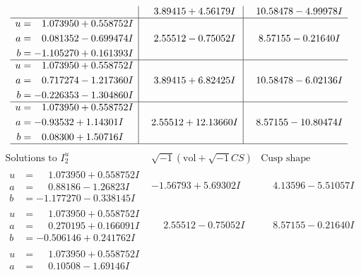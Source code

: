 \documentclass[1p]{elsarticle_modified}
\theoremstyle{definition}
\newcommand{\I}{\sqrt{-1}}
\begin{document}
$$\begin{array}{c|c|c}
 & \phantom{-}3.89415 + 4.56179 I & \phantom{-}10.58478 - 4.99978 I \\ \hline\begin{aligned}
u &= \phantom{-}1.073950 + 0.558752 I \\
a &= \phantom{-}0.081352 - 0.699474 I \\
b &= -1.105270 + 0.161393 I\end{aligned}
 & \phantom{-}2.55512 - 0.75052 I & \phantom{-}8.57155 - 0.21640 I \\ \hline\begin{aligned}
u &= \phantom{-}1.073950 + 0.558752 I \\
a &= \phantom{-}0.717274 - 1.217360 I \\
b &= -0.226353 - 1.304860 I\end{aligned}
 & \phantom{-}3.89415 + 6.82425 I & \phantom{-}10.58478 - 6.02136 I \\ \hline\begin{aligned}
u &= \phantom{-}1.073950 + 0.558752 I \\
a &= -0.93532 + 1.14301 I \\
b &= \phantom{-}0.08300 + 1.50716 I\end{aligned}
 & \phantom{-}2.55512 + 12.13660 I & \phantom{-}8.57155 - 10.80474 I\\
 \hline 
 \end{array}$$\newpage$$\begin{array}{c|c|c}  
\text{Solutions to }I^u_{2}& \I (\text{vol} + \sqrt{-1}CS) & \text{Cusp shape}\\
 \hline 
\begin{aligned}
u &= \phantom{-}1.073950 + 0.558752 I \\
a &= \phantom{-}0.88186 - 1.26823 I \\
b &= -1.177270 - 0.338145 I\end{aligned}
 & -1.56793 + 5.69302 I & \phantom{-}4.13596 - 5.51057 I \\ \hline\begin{aligned}
u &= \phantom{-}1.073950 + 0.558752 I \\
a &= \phantom{-}0.270195 + 0.166091 I \\
b &= -0.506146 + 0.241762 I\end{aligned}
 & \phantom{-}2.55512 - 0.75052 I & \phantom{-}8.57155 - 0.21640 I \\ \hline\begin{aligned}
u &= \phantom{-}1.073950 + 0.558752 I \\
a &= \phantom{-}0.10508 - 1.69146 I \\

\end{aligned}
\end{array}$$
\end{document}
